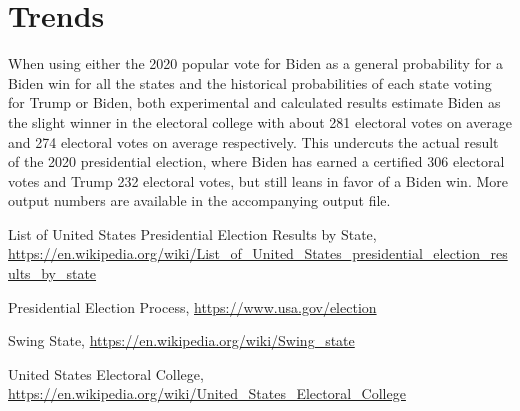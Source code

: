 \documentclass[12pt]{article}
\begin{document}
\section{Trends}

When using either the 2020 popular vote for Biden as a general probability for a Biden win for all the states and the historical probabilities of each state voting for Trump or Biden, both experimental and calculated results estimate Biden as the slight winner in the electoral college with about 281 electoral votes on average and 274 electoral votes on average respectively. This undercuts the actual result of the 2020 presidential election, where Biden has earned a certified 306 electoral votes and Trump 232 electoral votes, but still leans in favor of a Biden win. More output numbers are available in the accompanying output file.

\begin{thebibliography}{4}

List of United States Presidential Election Results by State,
\url{https://en.wikipedia.org/wiki/List_of_United_States_presidential_election_results_by_state}

Presidential Election Process,
\url{https://www.usa.gov/election}

Swing State,
\url{https://en.wikipedia.org/wiki/Swing\_state}

United States Electoral College,
\url{https://en.wikipedia.org/wiki/United_States_Electoral_College}
\end{thebibliography}
\end{document}
